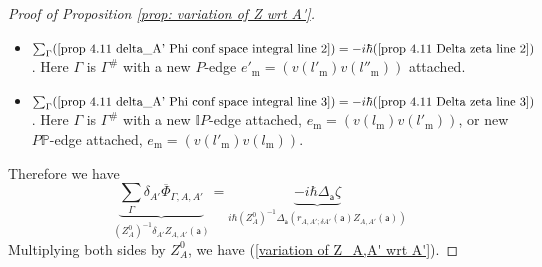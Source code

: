 \documentclass[11pt,a4paper]{amsart}
\theoremstyle{plain} %
\theoremstyle{definition}
\theoremstyle{remark}
\newcommand{\sfa}{\mathsf{a}}
\newcommand{\mm}{\mathrm{m}}
\newcommand{\II}{\mathbb{I}}
\newcommand{\PP}{\mathbb{P}}
\begin{document}
{\begin{proof}[%
Proof of Proposition \ref{prop: variation of Z wrt A'}]
\begin{itemize}
    \item $\sum_\Gamma (\ref{prop 4.11 delta_A' Phi conf space integral line 2})=-i\hbar (\ref{prop 4.11 Delta zeta line 2})$. Here $\Gamma$ is $\Gamma^\#$ with a new $P$-edge $e'_\mm=(v(l'_\mm)v(l''_\mm))$ attached. 
    \item $\sum_\Gamma (\ref{prop 4.11 delta_A' Phi conf space integral line 3})=-i\hbar (\ref{prop 4.11 Delta zeta line 3})$. Here $\Gamma$ is $\Gamma^\#$ with a new $\II P$-edge attached, $e_\mm=(v(l_\mm)v(l'_\mm))$, or new $P\PP$-edge attached, $e_\mm=(v(l'_\mm)v(l_\mm))$.
\end{itemize}
Therefore we have
\begin{equation}
    \underbrace{\sum_\Gamma \delta_{A'} \overline\Phi_{\Gamma,A,A'}}_{(Z^0_A)^{-1}\delta_{A'} Z_{A,A'}(\sfa)}=\underbrace{-i\hbar\Delta_\sfa\zeta}_{i\hbar (Z^0_A)^{-1} \Delta_\sfa(r_{A,A';\delta A'}(\sfa)Z_{A,A'}(\sfa))}
\end{equation}
Multiplying both sides by $Z^0_A$, we have (\ref{variation of Z_A,A' wrt A'}).

\end{proof}}
\end{document}
